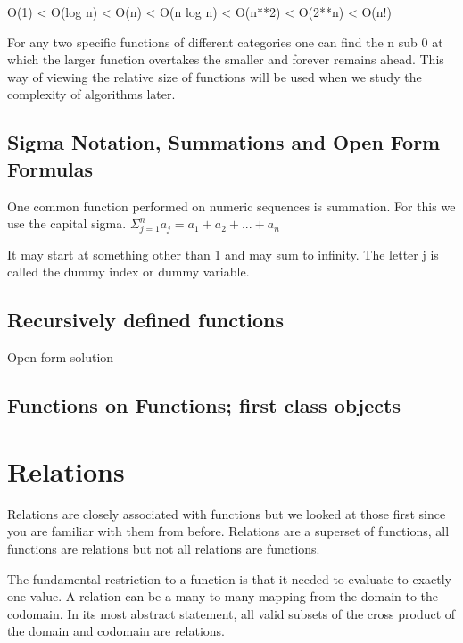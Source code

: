 \documentclass[11pt]{book} %
\theoremstyle {definition}
\theoremstyle {remark}
\begin{document}
O(1) < O(log n) < O(n) < O(n log n) < O(n**2) < O(2**n) < O(n!)

For any two specific functions of different categories one can find the n sub 0 at which the larger function overtakes the smaller and forever remains ahead. This way of viewing the relative size of functions will be used when we study the complexity of algorithms later.




\section {Sigma Notation, Summations and Open Form Formulas}
One common function performed on numeric sequences is summation. For this we use the capital sigma. $\Sigma_{j=1}^{n} a_j = a_1 + a_2+ ... + a_n$

It may start at something other than 1 and may sum to infinity. The letter j is called the dummy index or dummy variable.

\section {Recursively defined functions}
Open form solution

\section {Functions on Functions; first class objects}

\newpage









\chapter {Relations}

Relations are closely associated with functions but we looked at those first since you are familiar with them from before. Relations are a superset of functions, all functions are relations but not all relations are functions.

The fundamental restriction to a function is that it needed to evaluate to exactly one value. A relation can be a many-to-many mapping from the domain to the codomain. In its most abstract statement, all valid subsets of the cross product of the domain and codomain are relations.
\end{document}
